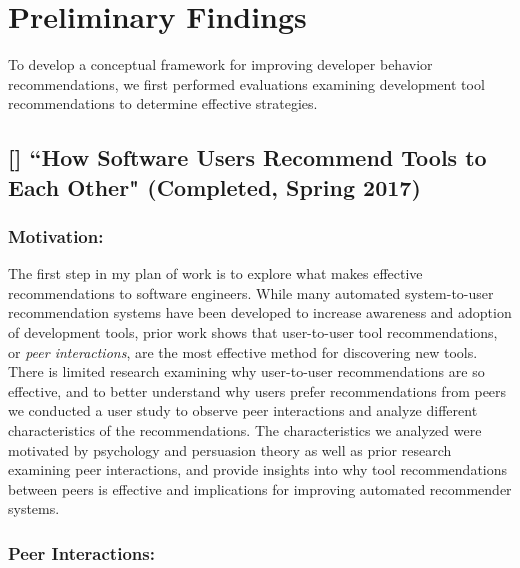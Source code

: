 \section{Preliminary Findings}
 
To develop a conceptual framework for improving developer behavior recommendations, we first performed evaluations examining development tool recommendations to determine effective strategies.

\subsection{[\peerT] ``How Software Users Recommend Tools to Each Other" (Completed, Spring 2017)}

\subsubsection{Motivation:}


The first step in my plan of work is to explore what makes effective recommendations to software engineers. While many automated system-to-user recommendation systems have been developed to increase awareness and adoption of development tools, prior work shows that user-to-user tool recommendations, or \textit{peer interactions}, are the most effective method for discovering new tools. There is limited research examining why user-to-user recommendations are so effective, and to better understand why users prefer recommendations from peers we conducted a user study to observe peer interactions and analyze different characteristics of the recommendations. The characteristics we analyzed were motivated by psychology and persuasion theory as well as prior research examining peer interactions, and provide insights into why tool recommendations between peers is effective and implications for improving automated recommender systems.

\subsubsection{Peer Interactions:}

